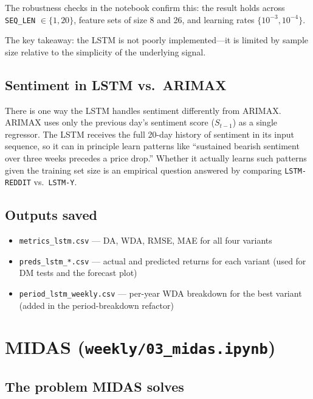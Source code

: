 \documentclass[12pt, a4paper]{article}
\begin{document}
The robustness checks in the notebook confirm this: the result holds across
\texttt{SEQ\_LEN} $\in \{1, 20\}$, feature sets of size 8 and 26, and learning rates
$\{10^{-3}, 10^{-4}\}$.

The key takeaway: the LSTM is not poorly implemented---it is limited by sample size
relative to the simplicity of the underlying signal.

\subsection{Sentiment in LSTM vs.\ ARIMAX}

There is one way the LSTM handles sentiment differently from ARIMAX. ARIMAX uses only
the previous day's sentiment score ($S_{t-1}$) as a single regressor. The LSTM
receives the full 20-day history of sentiment in its input sequence, so it can in
principle learn patterns like ``sustained bearish sentiment over three weeks precedes a
price drop.'' Whether it actually learns such patterns given the training set size is
an empirical question answered by comparing \texttt{LSTM-REDDIT} vs.\ \texttt{LSTM-Y}.

\subsection{Outputs saved}

\begin{itemize}
  \item \texttt{metrics\_lstm.csv} --- DA, WDA, RMSE, MAE for all four variants
  \item \texttt{preds\_lstm\_*.csv} --- actual and predicted returns for each variant
    (used for DM tests and the forecast plot)
  \item \texttt{period\_lstm\_weekly.csv} --- per-year WDA breakdown for the best
    variant (added in the period-breakdown refactor)
\end{itemize}

\section{MIDAS (\texttt{weekly/03\_midas.ipynb})}

\subsection{The problem MIDAS solves}
\end{document}
